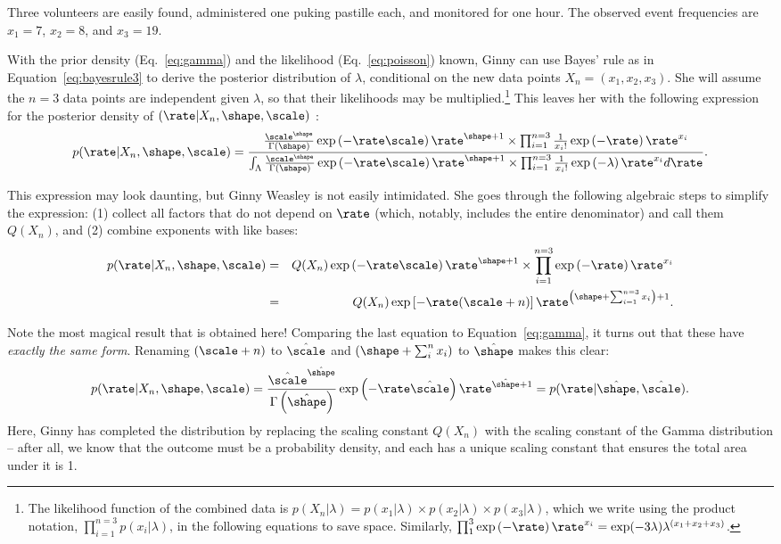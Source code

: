 Three volunteers are easily found, administered one puking pastille each, and monitored for one hour. The observed event frequencies are $x_1=7$, $x_2=8$, and $x_3=19$.

With the prior density (Eq.~\ref{eq:gamma}) and the likelihood (Eq.~\ref{eq:poisson}) known, Ginny can use Bayes' rule as in Equation~\ref{eq:bayesrule3} to derive the posterior distribution of $\lambda$, conditional on the new data points $X_n = (x_1, x_2, x_3)$. She will assume the $n=3$ data points are independent given $\lambda$, so that  their likelihoods may be multiplied.\footnote{The likelihood function of the combined data is ${p(X_n|\lambda) =p(x_1|\lambda)\times p(x_2|\lambda)\times p(x_3|\lambda)}$, which we write using the product notation, $ \prod_{i=1}^{n=3}p(x_i|\lambda)$, in the following equations to save space. Similarly, $\prod_1^3 \exp\left(-\rate\right) \rate^{x_i}={\exp(-3\lambda)\lambda^{(x_1+x_2+x_3)}}$.} This leaves her with the following expression for the posterior density of $(\rate|X_n,\shape,\scale)$  :\begin{eqnarray}p(\rate|X_n,\shape,\scale) =
\frac{ \frac{\scale^\shape}{\Gamma(\shape)} \exp\left(-\rate \scale\right) \rate^{\shape + 1} \times \prod_{i=1}^{n=3} \frac{1}{x_i!} \exp\left(-\rate\right) \rate^{x_i} } { \int_\Lambda \frac{\scale^\shape}{\Gamma(\shape)} \exp\left(-\rate \scale\right) \rate^{\shape + 1} \times \prod_{i=1}^{n=3} \frac{1}{x_i!} \exp\left(-\lambda\right) \rate^{x_i} d\rate }.\end{eqnarray}

This expression may look daunting, but Ginny Weasley is not easily intimidated. She goes through the following algebraic steps to simplify the expression: (1) collect all factors that do not depend on $\rate$ (which, notably, includes the entire denominator) and call them $Q(X_n)$, and (2) combine exponents with like bases:
\begin{eqnarray*}
p(\rate|X_n,\shape,\scale) &=& Q(X_n) \exp\left(-\rate \scale\right) \rate^{\shape + 1} \times \prod_{i=1}^{n=3} \exp\left(-\rate\right) \rate^{x_i} \\
&=& Q(X_n) \exp\left[-\rate(\scale + n)\right] \rate^{\left(\shape + \sum_{i=1}^{n=3} x_i\right) + 1}.
\end{eqnarray*}

Note the most magical result that is obtained here! Comparing the last equation to Equation~\ref{eq:gamma}, it turns out that these have \emph{exactly the same form}.  Renaming $(\scale+n)$ to $\hat\scale$ and $\left(\shape + \sum_i^n x_i\right)$ to $\hat\shape$ makes this  clear:
$$p(\rate|X_n,\shape,\scale) = \frac{\hat\scale^{\hat\shape}}{\Gamma\left(\hat\shape\right)} \exp\left(-\rate\hat\scale\right) \rate^{\hat\shape + 1} = p(\rate|\hat\shape,\hat\scale).$$
\noindent Here, Ginny has completed the distribution by replacing the scaling constant $Q(X_n)$ with the scaling constant of the Gamma distribution -- after all, we know that the outcome must be a {probability density}, and each  has a unique scaling constant that ensures the total area under it is 1.

